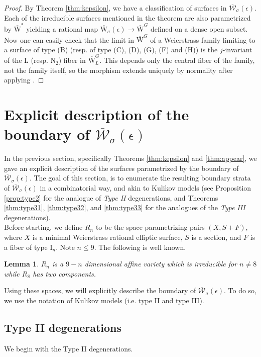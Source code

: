 \documentclass[11pt]{amsart}
\newtheorem{lemma}[theorem]{Lemma}
\theoremstyle{definition}
\theoremstyle{remark}
\newcommand{\oMG}{\overline{\mathrm{W}}^G}
\newcommand{\sbb}{\overline{\mathrm{W}}^{*}}
\newcommand{\kepsilon}{\overline{\mathcal{W}}_\sigma(\epsilon)}
\newcommand{\kepsiloncoarse}{{\overline{\mathrm{W}}}_\sigma(\epsilon)}
\begin{document}
	\begin{proof} 
		By Theorem \ref{thm:kepsilon}, we have a classification of surfaces in $\kepsilon$. Each of the irreducible surfaces mentioned in the theorem are also parametrized by $\sbb$ yielding a rational map $\kepsiloncoarse \to \oMG$ defined on a dense open subset. Now one can easily check that the limit in $\oMG$ of a Weierstrass family limiting to a surface of type (B) (resp. of type (C), (D), (G), (F) and (H)) is the $j$-invariant of the L (resp. $\mathrm{N}_2$) fiber in $\oMG_{L}$. This depends only the central fiber of the family, not the family itself, so the morphism extends uniquely by normality after applying \cite[Theorem 7.3]{gg}. 
	\end{proof}
	
	\section{Explicit description of the boundary of $\kepsilon$}\label{sec:explicitboundary}
	In the previous section, specifically Theorems \ref{thm:kepsilon} and \ref{thm:appear}, we gave an explicit description of the surfaces parametrized by the boundary of $\kepsilon$. The goal of this section, is to enumerate the resulting boundary strata of $\kepsilon$ in a combinatorial way, and akin to Kulikov models (see Proposition \ref{prop:type2} for the analogue of \emph{Type II} degenerations, and Theorems \ref{thm:type31}, \ref{thm:type32}, and \ref{thm:type33} for the analogues of the \emph{Type III} degenerations).\\ 
	
	Before starting, we define $R_n$ to be the space parametrizing pairs $(X, S + F)$, where $X$ is a minimal Weierstrass rational elliptic surface, $S$ is a section, and $F$ is a fiber of type $\mathrm{I}_n$. Note $n \le 9$. The following is well known.
	
	\begin{lemma}\cite[Section 3.3]{hl} $R_n$ is a $9-n$ dimensional affine variety which is irreducible for $n \neq 8$ while $R_8$ has two components. 
	\end{lemma}
	
	Using these spaces, we will explicitly describe the boundary of $\kepsilon$. To do so, we use the notation of Kulikov models (i.e. type II and type III). 
	
	\subsection{Type II degenerations}
	We begin with the Type II degenerations. 
	
\end{document}
